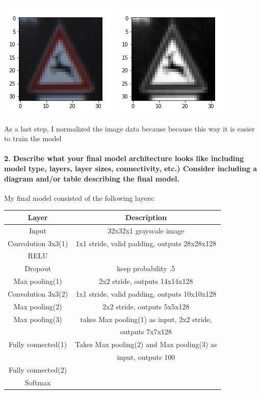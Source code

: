 \documentclass[11pt]{article}
\makeatletter
\def\maxwidth{\ifdim\Gin@nat@width>\linewidth\linewidth
    \else\Gin@nat@width\fi}
\let\Oldincludegraphics\includegraphics
\renewcommand{\includegraphics}[1]{\Oldincludegraphics[width=.8\maxwidth]{#1}}
\makeatother
\begin{document}
\includegraphics{imageOriginal.png} \includegraphics{imageGrayscale.png}

As a last step, I normalized the image data because because this way it
is easier to train the model

    \hypertarget{describe-what-your-final-model-architecture-looks-like-including-model-type-layers-layer-sizes-connectivity-etc.-consider-including-a-diagram-andor-table-describing-the-final-model.}{%
\paragraph{2. Describe what your final model architecture looks like
including model type, layers, layer sizes, connectivity, etc.) Consider
including a diagram and/or table describing the final
model.}\label{describe-what-your-final-model-architecture-looks-like-including-model-type-layers-layer-sizes-connectivity-etc.-consider-including-a-diagram-andor-table-describing-the-final-model.}}

My final model consisted of the following layers:

\begin{longtable}[]{@{}cc@{}}
\toprule
Layer & Description\tabularnewline
\midrule
\endhead
Input & 32x32x1 grayscale image\tabularnewline
Convolution 3x3(1) & 1x1 stride, valid padding, outputs
28x28x128\tabularnewline
RELU &\tabularnewline
Dropout & keep probability .5\tabularnewline
Max pooling(1) & 2x2 stride, outputs 14x14x128\tabularnewline
Convolution 3x3(2) & 1x1 stride, valid padding, outputs
10x10x128\tabularnewline
Max pooling(2) & 2x2 stride, outputs 5x5x128\tabularnewline
Max pooling(3) & takes Max pooling(1) as input, 2x2
stride,\tabularnewline
& outputs 7x7x128\tabularnewline
Fully connected(1) & Takes Max pooling(2) and Max pooling(3)
as\tabularnewline
& input, outputs 100\tabularnewline
Fully connected(2) &\tabularnewline
Softmax &\tabularnewline
\bottomrule
\end{longtable}
\end{document}
